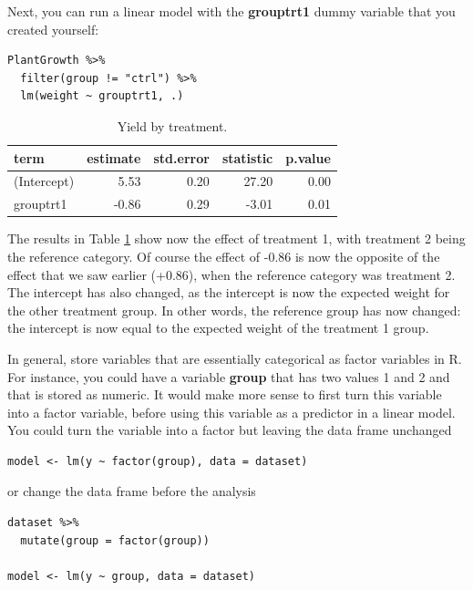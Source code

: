\documentclass[]{book}\usepackage[]{graphicx}\usepackage[]{color}
\begin{document}
Next, you can run a linear model with the \textbf{grouptrt1} dummy variable that you created yourself:

\begin{lstlisting}
PlantGrowth %>% 
  filter(group != "ctrl") %>% 
  lm(weight ~ grouptrt1, .)
\end{lstlisting}


\begin{table}[ht]
\centering
\caption{Yield by treatment.} 
\label{tab:dummy_10_r}
\begin{tabular}{lrrrr}
  \hline
term & estimate & std.error & statistic & p.value \\ 
  \hline
(Intercept) & 5.53 & 0.20 & 27.20 & 0.00 \\ 
  grouptrt1 & -0.86 & 0.29 & -3.01 & 0.01 \\ 
   \hline
\end{tabular}
\end{table}


The results in Table \ref{tab:dummy_10_r} show now the effect of treatment 1, with treatment 2 being the reference category. Of course the effect of -0.86 is now the opposite of the effect that we saw earlier (+0.86), when the reference category was treatment 2. The intercept has also changed, as the intercept is now the expected weight for the other treatment group. In other words, the reference group has now changed: the intercept is now equal to the expected weight of the treatment 1 group.

In general, store variables that are essentially categorical as factor variables in R. For instance, you could have a variable \textbf{group} that has two values 1 and 2 and that is stored as numeric. It would make more sense to first turn this variable into a factor variable, before using this variable as a predictor in a linear model. You could turn the variable into a factor but leaving the data frame unchanged 

\begin{lstlisting}
model <- lm(y ~ factor(group), data = dataset)
\end{lstlisting}

or change the data frame before the analysis

\begin{lstlisting}
dataset %>% 
  mutate(group = factor(group))
  
model <- lm(y ~ group, data = dataset)
\end{lstlisting}
\end{document}

